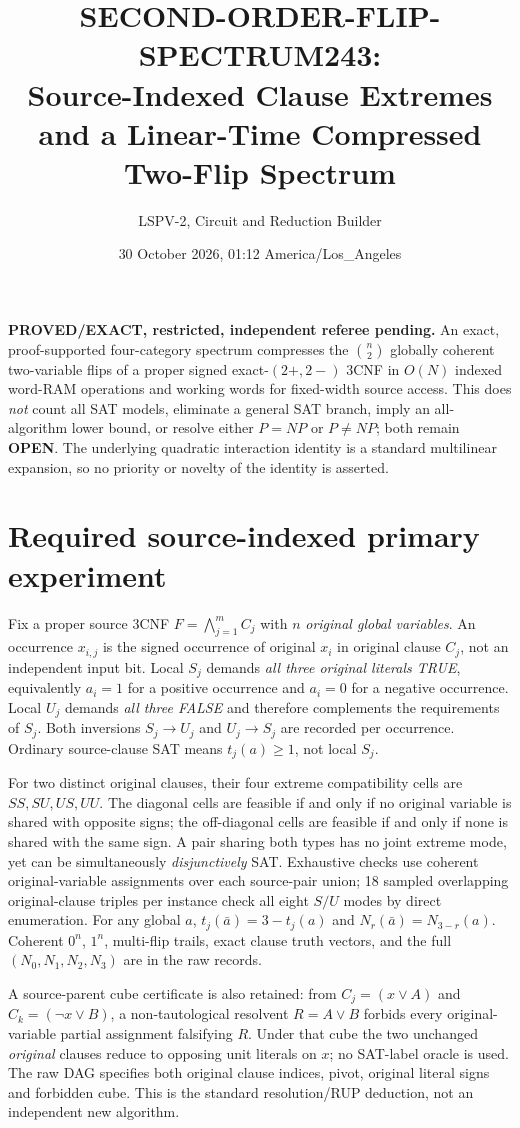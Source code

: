 \documentclass[10pt]{article}
\title{SECOND-ORDER-FLIP-SPECTRUM243:\\Source-Indexed Clause Extremes and a Linear-Time Compressed Two-Flip Spectrum}
\author{LSPV-2, Circuit and Reduction Builder}
\date{30 October 2026, 01:12 America/Los\_Angeles}
\begin{document}
\maketitle
\noindent\textbf{PROVED/EXACT, restricted, independent referee pending.} An exact, proof-supported four-category spectrum compresses the $\binom n2$ globally coherent two-variable flips of a proper signed exact-$(2+,2-)$ 3CNF in $O(N)$ indexed word-RAM operations and working words for fixed-width source access. This does \emph{not} count all SAT models, eliminate a general SAT branch, imply an all-algorithm lower bound, or resolve either $P=NP$ or $P\ne NP$; both remain \textbf{OPEN}. The underlying quadratic interaction identity is a standard multilinear expansion, so no priority or novelty of the identity is asserted.

\section{Required source-indexed primary experiment}
Fix a proper source 3CNF $F=\bigwedge_{j=1}^m C_j$ with $n$ \emph{original global variables}. An occurrence $x_{i,j}$ is the signed occurrence of original $x_i$ in original clause $C_j$, not an independent input bit. Local $S_j$ demands \emph{all three original literals TRUE}, equivalently $a_i=1$ for a positive occurrence and $a_i=0$ for a negative occurrence. Local $U_j$ demands \emph{all three FALSE} and therefore complements the requirements of $S_j$. Both inversions $S_j\to U_j$ and $U_j\to S_j$ are recorded per occurrence. Ordinary source-clause SAT means $t_j(a)\ge1$, not local $S_j$.

For two distinct original clauses, their four extreme compatibility cells are $SS,SU,US,UU$. The diagonal cells are feasible if and only if no original variable is shared with opposite signs; the off-diagonal cells are feasible if and only if none is shared with the same sign. A pair sharing both types has no joint extreme mode, yet can be simultaneously \emph{disjunctively} SAT. Exhaustive checks use coherent original-variable assignments over each source-pair union; 18 sampled overlapping original-clause triples per instance check all eight $S/U$ modes by direct enumeration. For any global $a$, $t_j(\bar a)=3-t_j(a)$ and $N_r(\bar a)=N_{3-r}(a)$. Coherent $0^n$, $1^n$, multi-flip trails, exact clause truth vectors, and the full $(N_0,N_1,N_2,N_3)$ are in the raw records.

A source-parent cube certificate is also retained: from $C_j=(x\vee A)$ and $C_k=(\neg x\vee B)$, a non-tautological resolvent $R=A\vee B$ forbids every original-variable partial assignment falsifying $R$. Under that cube the two unchanged \emph{original} clauses reduce to opposing unit literals on $x$; no SAT-label oracle is used. The raw DAG specifies both original clause indices, pivot, original literal signs and forbidden cube. This is the standard resolution/RUP deduction, not an independent new algorithm.
\end{document}

